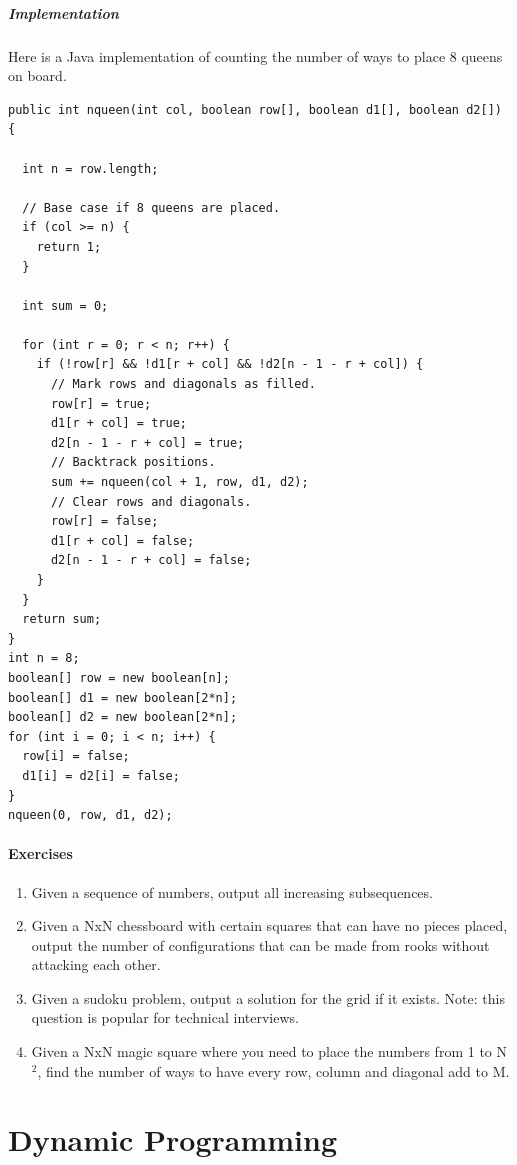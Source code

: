 \documentclass[11pt,oneside]{book}
\begin{document}
\subsubsection{Implementation}

Here is a Java implementation of counting the number of ways to place 8 queens on board.

\begin{lstlisting}
public int nqueen(int col, boolean row[], boolean d1[], boolean d2[]) {
  
  int n = row.length;
  
  // Base case if 8 queens are placed.
  if (col >= n) {
    return 1;
  }

  int sum = 0;

  for (int r = 0; r < n; r++) {
    if (!row[r] && !d1[r + col] && !d2[n - 1 - r + col]) {
      // Mark rows and diagonals as filled.
      row[r] = true;
      d1[r + col] = true;
      d2[n - 1 - r + col] = true;
      // Backtrack positions.
      sum += nqueen(col + 1, row, d1, d2);
      // Clear rows and diagonals.
      row[r] = false;
      d1[r + col] = false;
      d2[n - 1 - r + col] = false;
    }
  }
  return sum;
}
int n = 8;
boolean[] row = new boolean[n];
boolean[] d1 = new boolean[2*n];
boolean[] d2 = new boolean[2*n];
for (int i = 0; i < n; i++) {
  row[i] = false;
  d1[i] = d2[i] = false;
}
nqueen(0, row, d1, d2);
\end{lstlisting}

\subsection{Exercises}

\begin{enumerate}
\item Given a sequence of numbers, output all increasing subsequences.
\item Given a NxN chessboard with certain squares that can have no pieces placed, output the number of configurations that can be made from rooks without attacking each other.
\item Given a sudoku problem, output a solution for the grid if it exists. Note: this question is popular for technical interviews.
\item Given a NxN magic square where you need to place the numbers from 1 to N$^{2}$, find the number of ways to have every row, column and diagonal add to M.
\end{enumerate}

\part{ Dynamic Programming }
\end{document}
